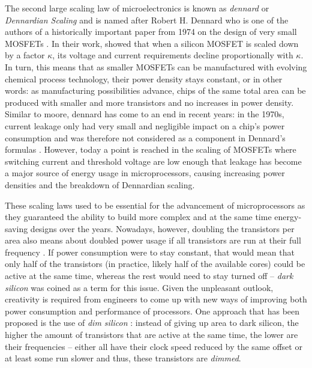 The second large scaling law of microelectronics is known as \emph{\gls{dennard}} or \emph{Dennardian Scaling} and is named after Robert H. Dennard who is one of the authors of a historically important paper from 1974 on the design of very small \glspl{MOSFET} \cite{dennard1974design}. In their work, \citeauthor{dennard1974design} showed that when a silicon \gls{MOSFET} is scaled down by a factor $\kappa$, its voltage and current requirements decline proportionally with $\kappa$. In turn, this means that as smaller \glspl{MOSFET} can be manufactured with evolving chemical process technology, their power density stays constant, or in other words: as manufacturing possibilities advance, chips of the same total area can be produced with smaller and more transistors and no increases in power density. Similar to \gls{moore}, \gls{dennard} has come to an end in recent years: in the 1970s, current leakage only had very small and negligible impact on a chip's power consumption and was therefore not considered as a component in Dennard's formulas \cite{bohr200730}. However, today a point is reached in the scaling of \glspl{MOSFET} where switching current and threshold voltage are low enough that leakage has become a major source of energy usage in microprocessors, causing increasing power densities and the breakdown of Dennardian scaling.

These scaling laws used to be essential for the advancement of microprocessors as they guaranteed the ability to build more complex and at the same time energy-saving designs over the years. Nowadays, however, doubling the transistors per area also means about doubled power usage if all transistors are run at their full frequency \cite{taylor2012dark}. If power consumption were to stay constant, that would mean that only half of the transistors (in practice, likely half of the available cores) could be active at the same time, whereas the rest would need to stay turned off -- \emph{dark silicon} was coined as a term for this issue. Given the unpleasant outlook, creativity is required from engineers to come up with new ways of improving both power consumption and performance of processors. One approach that has been proposed is the use of \emph{dim silicon} \cite{huang2011scaling}: instead of giving up area to dark silicon, the higher the amount of transistors that are active at the same time, the lower are their frequencies -- either all have their clock speed reduced by the same offset or at least some run slower and thus, these transistors are \emph{dimmed}.

